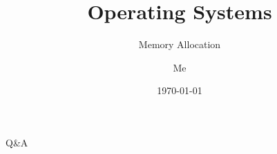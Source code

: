 \documentclass[12pt]{beamer}
\title{Operating Systems}
\subtitle{Memory Allocation}
\author{Me}
\date{\today}
\begin{document}
  \begin{frame}
    \titlepage
  \end{frame}

  
  
  
  

  \begin{frame}
  \begin{center}
  \Huge Q\&A
  \end{center}
  \end{frame}
\end{document}

